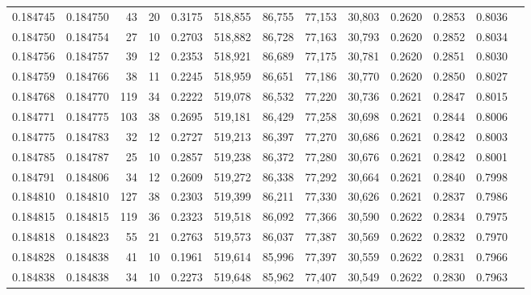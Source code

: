 \begin{tabular}{rrrrrrrrrrrrr}
0.184745 & 0.184750 &    43 &  20 &                                     0.3175 & 518,855 &  86,755 &  77,153 &  30,803 & 0.2620 & 0.2853 & 0.8036 \\
0.184750 & 0.184754 &    27 &  10 &                                     0.2703 & 518,882 &  86,728 &  77,163 &  30,793 & 0.2620 & 0.2852 & 0.8034 \\
0.184756 & 0.184757 &    39 &  12 &                                     0.2353 & 518,921 &  86,689 &  77,175 &  30,781 & 0.2620 & 0.2851 & 0.8030 \\
0.184759 & 0.184766 &    38 &  11 &                                     0.2245 & 518,959 &  86,651 &  77,186 &  30,770 & 0.2620 & 0.2850 & 0.8027 \\
0.184768 & 0.184770 &   119 &  34 &                                     0.2222 & 519,078 &  86,532 &  77,220 &  30,736 & 0.2621 & 0.2847 & 0.8015 \\
0.184771 & 0.184775 &   103 &  38 &                                     0.2695 & 519,181 &  86,429 &  77,258 &  30,698 & 0.2621 & 0.2844 & 0.8006 \\
0.184775 & 0.184783 &    32 &  12 &                                     0.2727 & 519,213 &  86,397 &  77,270 &  30,686 & 0.2621 & 0.2842 & 0.8003 \\
0.184785 & 0.184787 &    25 &  10 &                                     0.2857 & 519,238 &  86,372 &  77,280 &  30,676 & 0.2621 & 0.2842 & 0.8001 \\
0.184791 & 0.184806 &    34 &  12 &                                     0.2609 & 519,272 &  86,338 &  77,292 &  30,664 & 0.2621 & 0.2840 & 0.7998 \\
0.184810 & 0.184810 &   127 &  38 &                                     0.2303 & 519,399 &  86,211 &  77,330 &  30,626 & 0.2621 & 0.2837 & 0.7986 \\
0.184815 & 0.184815 &   119 &  36 &                                     0.2323 & 519,518 &  86,092 &  77,366 &  30,590 & 0.2622 & 0.2834 & 0.7975 \\
0.184818 & 0.184823 &    55 &  21 &                                     0.2763 & 519,573 &  86,037 &  77,387 &  30,569 & 0.2622 & 0.2832 & 0.7970 \\
0.184828 & 0.184838 &    41 &  10 &                                     0.1961 & 519,614 &  85,996 &  77,397 &  30,559 & 0.2622 & 0.2831 & 0.7966 \\
0.184838 & 0.184838 &    34 &  10 &                                     0.2273 & 519,648 &  85,962 &  77,407 &  30,549 & 0.2622 & 0.2830 & 0.7963 \\

\end{tabular}
